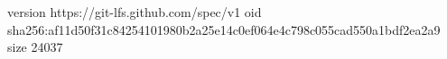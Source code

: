 version https://git-lfs.github.com/spec/v1
oid sha256:af11d50f31c84254101980b2a25e14c0ef064e4c798c055cad550a1bdf2ea2a9
size 24037
